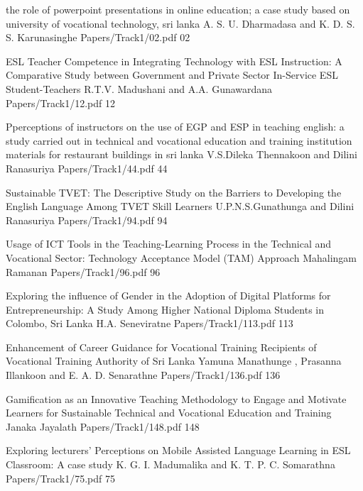 \addpaper
{the role of powerpoint presentations in online education; a case study based on university of vocational technology, sri lanka}
{A. S. U. Dharmadasa and K. D. S. S. Karunasinghe}
{Papers/Track1/02.pdf}
{02}




   \addpaper
{ESL Teacher Competence in Integrating Technology with ESL Instruction: A Comparative Study between Government and Private Sector In-Service ESL Student-Teachers}
 {R.T.V. Madushani and A.A. Gunawardana} 
 {Papers/Track1/12.pdf}
   {12} 


\addpaper
{Pperceptions of instructors on the use of EGP and ESP in teaching english: a study carried out in technical and vocational education and training institution materials for restaurant buildings in sri lanka}
{V.S.Dileka Thennakoon and Dilini Ranasuriya}
{Papers/Track1/44.pdf}
{44}


\addpaper
{Sustainable TVET: The Descriptive Study on the Barriers to Developing the English Language Among TVET Skill Learners}
{U.P.N.S.Gunathunga and Dilini Ranasuriya}
{Papers/Track1/94.pdf}
{94}


   \addpaper
{Usage of ICT Tools in the Teaching-Learning Process in the Technical and Vocational Sector: Technology Acceptance Model (TAM) Approach}
 {Mahalingam Ramanan} 
 {Papers/Track1/96.pdf}
   {96} 


\addpaper
{Exploring the influence of Gender in the Adoption of Digital Platforms for Entrepreneurship: A Study Among Higher National Diploma Students in Colombo, Sri Lanka}
{H.A. Seneviratne}
{Papers/Track1/113.pdf}
{113}

\addpaper
{Enhancement of Career Guidance for Vocational Training Recipients of Vocational Training Authority of Sri Lanka}
{Yamuna Manathunge , Prasanna Illankoon and E. A. D. Senarathne}
{Papers/Track1/136.pdf}
{136}


\addpaper
{Gamification as an Innovative Teaching Methodology to Engage and Motivate Learners for Sustainable Technical and Vocational Education and Training}
{Janaka Jayalath}
{Papers/Track1/148.pdf}
{148}



\addpaper
{Exploring lecturers' Perceptions on Mobile Assisted Language Learning in ESL Classroom: A case study}
{K. G. I. Madumalika and K. T. P. C. Somarathna}
{Papers/Track1/75.pdf}
{75}
